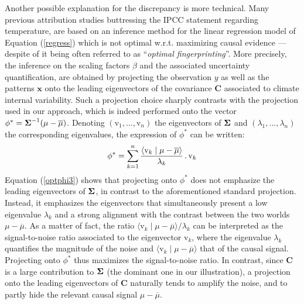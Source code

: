 \documentclass[12pt]{article}
\newcommand{\Sig}{\mbox{\boldmath \(\Sigma\)}}
\newcommand{\x}{\boldsymbol{x}}
\newcommand{\vv}{\textrm{v}}
\begin{document}
Another possible explanation for the discrepancy is more technical. Many previous attribution studies buttressing the IPCC statement regarding temperature, are based on an inference method for the linear regression model of Equation (\ref{regress}) which is not optimal w.r.t. maximizing causal evidence --- despite of it being often referred to as ``\textit{optimal fingerprinting}''. More precisely, the inference on the scaling factors $\beta$ and the associated uncertainty quantification, are obtained by projecting the observation $y$ as well as the patterns $\x$ onto the leading eigenvectors of the covariance $\mathbf C$ associated to climate internal variability. Such a projection choice sharply contrasts with the projection used in our approach, which is indeed performed onto the vector $\phi^*= \Sig^{-1}(\mu-\overline{\mu})$. Denoting $(\vv_1,...,\vv_n)$ the eigenvectors of $\Sig$ and $(\lambda_1,...,\lambda_n)$ the corresponding eigenvalues, the expression of $\phi^*$ can be written:
\begin{equation} 
\label{optphi3}
\phi^* =\sum_{k=1}^n \frac{\langle \vv_k\mid \mu-\overline{\mu}\rangle}{\lambda_k}\,.\,\vv_k\\
\end{equation}
%
%
%
Equation (\ref{optphi3}) shows that projecting onto $\phi^*$ does not emphasize the leading eigenvectors of $\Sig$, in contrast to the aforementioned standard projection. Instead, it emphasizes the eigenvectors that simultaneously present a low eigenvalue $\lambda_k$ and a strong alignment with the contrast between the two worlds $\mu-\overline{\mu}$. As a matter of fact, the ratio $\langle \vv_k\mid \mu-\overline{\mu}\rangle/\lambda_k$ can be interpreted as the signal-to-noise ratio associated to the eigenvector $\vv_k$, where the eigenvalue $\lambda_k$ quantifies the magnitude of the noise and $\langle\vv_k\mid \mu-\overline{\mu}\rangle$ that of the causal signal. Projecting onto $\phi^*$ thus maximizes the signal-to-noise ratio. In contrast, since $\mathbf C$ is a large contribution to $\Sig$ (the dominant one in our illustration), a projection onto the leading eigenvectors of $\mathbf C$ naturally tends to amplify the noise, and to partly hide the relevant causal signal $\mu-\overline{\mu}$.
\end{document}

